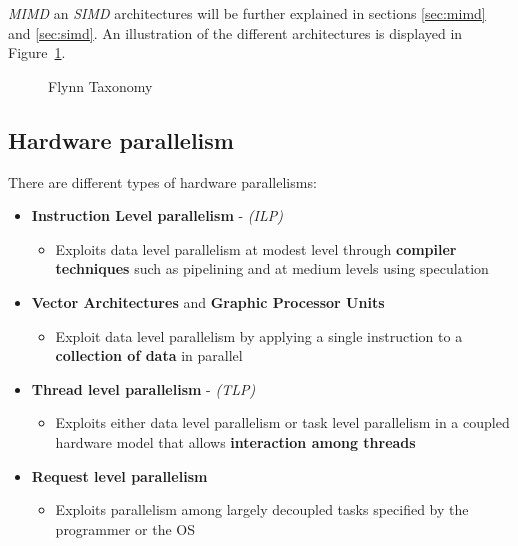 \documentclass[english]{article}
\begin{document}
\bigskip
\textit{MIMD} an \textit{SIMD} architectures will be further explained in sections \ref{sec:mimd} and \ref{sec:simd}.
An illustration of the different architectures is displayed in Figure~\ref{fig:flynn-taxonomy}.

\begin{figure}[htbp]
  \bigskip
  \centering
  \caption{Flynn Taxonomy}
  \label{fig:flynn-taxonomy}
  \bigskip
\end{figure}

\clearpage

\subsection{Hardware parallelism}

There are different types of hardware parallelisms:

\begin{itemize}
  \item \textbf{Instruction Level parallelism} - \textit{(ILP)}
        \begin{itemize}
          \item Exploits data level parallelism at modest level through \textbf{compiler techniques} such as pipelining and at medium levels using speculation
        \end{itemize}
  \item \textbf{Vector Architectures} and \textbf{Graphic Processor Units}
        \begin{itemize}
          \item Exploit data level parallelism by applying a single instruction to a \textbf{collection of data} in parallel
        \end{itemize}
  \item \textbf{Thread level parallelism} - \textit{(TLP)}
        \begin{itemize}
          \item Exploits either data level parallelism or task level parallelism in a coupled hardware model that allows \textbf{interaction among threads}
        \end{itemize}
  \item \textbf{Request level parallelism}
        \begin{itemize}
          \item Exploits parallelism among largely decoupled tasks specified by the programmer or the OS
        \end{itemize}
\end{itemize}
\end{document}
